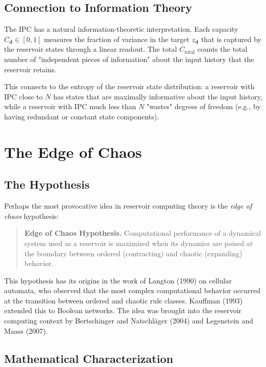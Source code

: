 \subsection{Connection to Information Theory}\label{sec:15.6.4}

The IPC has a natural information-theoretic interpretation. Each capacity
$C_{\mathbf{d}} \in [0, 1]$ measures the fraction of variance in the target
$z_{\mathbf{d}}$ that is captured by the reservoir states through a linear readout.
The total $C_{\text{total}}$ counts the total number of "independent pieces of information"
about the input history that the reservoir retains.

This connects to the entropy of the reservoir state distribution: a reservoir with
IPC close to $N$ has states that are maximally informative about the input history,
while a reservoir with IPC much less than $N$ "wastes" degrees of freedom (e.g., by
having redundant or constant state components).


\bigskip


\section{The Edge of Chaos}\label{sec:15.7}

\subsection{The Hypothesis}\label{sec:15.7.1}

Perhaps the most provocative idea in reservoir computing theory is the \textit{edge of chaos}
hypothesis:

\begin{quote}
\textbf{Edge of Chaos Hypothesis.} Computational performance of a dynamical system used
as a reservoir is maximized when its dynamics are poised at the boundary between
ordered (contracting) and chaotic (expanding) behavior.
\end{quote}

This hypothesis has its origins in the work of Langton (1990) on cellular automata,
who observed that the most complex computational behavior occurred at the transition
between ordered and chaotic rule classes. Kauffman (1993) extended this to Boolean
networks. The idea was brought into the reservoir computing context by Bertschinger
and Natschl\"ager (2004) and Legenstein and Maass (2007).

\subsection{Mathematical Characterization}\label{sec:15.7.2}

